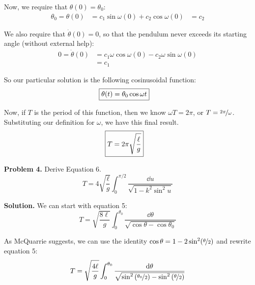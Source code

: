 \documentclass{article}
\begin{document}
Now, we require that $\theta (0) = \theta_0$:
\begin{equation*}
\begin{aligned}
\theta_0 = \theta (0) &= c_1\sin\omega (0) + c_2\cos\omega (0)
&= c_2
\end{aligned}
\end{equation*}

We also require that $\dot\theta (0) = 0$, so that the pendulum never exceeds its starting angle (without external help):
\begin{equation*}
\begin{aligned}
0 = \dot\theta (0) &= c_1\omega\cos\omega (0) - c_2\omega\sin\omega (0) \\
&= c_1
\end{aligned}
\end{equation*}

So our particular solution is the following cosinusoidal function:
\begin{equation}
\begin{aligned}
\Aboxed{\theta (t) = \theta_0\cos\omega t}
\end{aligned}
\end{equation}

Now, if $T$ is the period of this function, then we know $\omega T = 2\pi$, or $T = \nicefrac{2\pi}{\omega}$. Substituting our definition for $\omega$, we have this final result.
\begin{equation*}
\begin{aligned}
\Aboxed{T = 2\pi\sqrt{\frac{\ell}{g}}}
\end{aligned}
\end{equation*}

\textbf{Problem 4.} Derive Equation 6.
\[
T = 4\sqrt{\frac{\ell}{g}}\int_{0}^{\pi/2}\frac{\dd u}{\sqrt{1-k^2\sin^2 u}} \tag{Eq. 6, pg. 138} \label{eq:6}
\]

\textbf{Solution.} We can start with equation 5:
\[
T = \sqrt{\frac{8\ell}{g}}\int_{0}^{\theta_0}\frac{\dd\theta}{\sqrt{\cos\theta-\cos\theta_0}} \tag{Eq. 5, pg. 138} \label{eq:5}
\]

As McQuarrie suggests, we can use the identity $\cos\theta = 1-2\sin^2(\nicefrac{\theta}{2})$ and rewrite equation 5:
\begin{equation*}
\begin{aligned}
T = \sqrt{\frac{4\ell}{g}}\int_{0}^{\theta_0}\frac{\dd\theta}{\sqrt{\sin^2\left(\nicefrac{\theta_0}{2}\right)-\sin^2\left(\nicefrac{\theta}{2}\right)}}
\end{aligned}
\end{equation*}
\end{document}
